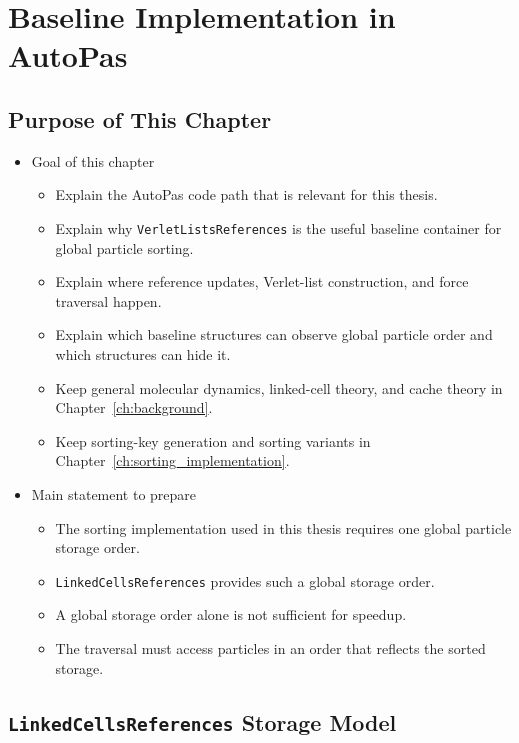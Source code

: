 \chapter{Baseline Implementation in AutoPas}
\label{ch:baseline_implementation}

\section{Purpose of This Chapter}
\label{sec:baseline_purpose}

\begin{itemize}
    \item Goal of this chapter
    \begin{itemize}
        \item Explain the AutoPas code path that is relevant for this thesis.
        \item Explain why \texttt{VerletListsReferences} is the useful baseline container for global particle sorting.
        \item Explain where reference updates, Verlet-list construction, and force traversal happen.
        \item Explain which baseline structures can observe global particle order and which structures can hide it.
        \item Keep general molecular dynamics, linked-cell theory, and cache theory in Chapter~\ref{ch:background}.
        \item Keep sorting-key generation and sorting variants in Chapter~\ref{ch:sorting_implementation}.
    \end{itemize}

    \item Main statement to prepare
    \begin{itemize}
        \item The sorting implementation used in this thesis requires one global particle storage order.
        \item \texttt{LinkedCellsReferences} provides such a global storage order.
        \item A global storage order alone is not sufficient for speedup.
        \item The traversal must access particles in an order that reflects the sorted storage.
    \end{itemize}
\end{itemize}

\section{\texttt{LinkedCellsReferences} Storage Model}
\label{sec:baseline_linked_cells_references}

